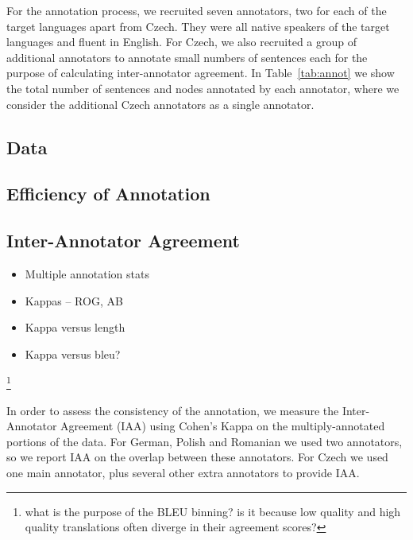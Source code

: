 \documentclass[11pt]{article}
\newcommand{\tabref}[1]{Table~\ref{#1}}
\newcommand{\oa}[1]{\footnote{\color{red} #1}}
\begin{document}
For the annotation process, we recruited seven annotators, two for each of the target languages apart from Czech. They were
all native speakers of the target languages and fluent in English. For Czech, we also recruited a  group of additional annotators
to annotate small numbers of sentences each for the purpose of calculating inter-annotator agreement. In \tabref{tab:annot}
we show the total number of sentences and nodes annotated by each annotator, where we consider the additional Czech
annotators as a single annotator.

\subsection{Data}\label{sec:data}

\subsection{Efficiency of Annotation}\label{sec:efficiency}



\subsection{Inter-Annotator Agreement}
\begin{itemize}
  \item Multiple annotation stats
  \item Kappas -- ROG, AB
  \item Kappa versus length
  \item Kappa versus bleu?
\end{itemize}

\oa{what is the purpose of the BLEU binning? is it because low quality and high
quality translations often diverge in their agreement scores?}



In order to assess the consistency of the annotation, we measure the Inter-Annotator
Agreement (IAA) using Cohen's Kappa on the multiply-annotated portions of the data.
For German, Polish and Romanian we used two annotators, so we report IAA on the overlap
between these annotators. For Czech we used one main annotator, plus several other extra
annotators to provide IAA. 
\end{document}
